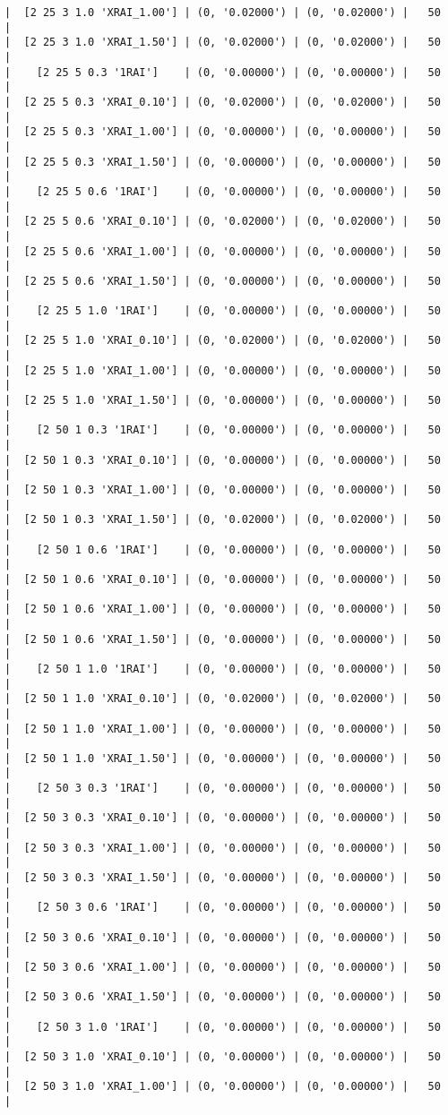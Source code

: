\documentclass{article}
\begin{document}
\begin{verbatim}
|  [2 25 3 1.0 'XRAI_1.00'] | (0, '0.02000') | (0, '0.02000') |   50  |
|  [2 25 3 1.0 'XRAI_1.50'] | (0, '0.02000') | (0, '0.02000') |   50  |
|    [2 25 5 0.3 '1RAI']    | (0, '0.00000') | (0, '0.00000') |   50  |
|  [2 25 5 0.3 'XRAI_0.10'] | (0, '0.02000') | (0, '0.02000') |   50  |
|  [2 25 5 0.3 'XRAI_1.00'] | (0, '0.00000') | (0, '0.00000') |   50  |
|  [2 25 5 0.3 'XRAI_1.50'] | (0, '0.00000') | (0, '0.00000') |   50  |
|    [2 25 5 0.6 '1RAI']    | (0, '0.00000') | (0, '0.00000') |   50  |
|  [2 25 5 0.6 'XRAI_0.10'] | (0, '0.02000') | (0, '0.02000') |   50  |
|  [2 25 5 0.6 'XRAI_1.00'] | (0, '0.00000') | (0, '0.00000') |   50  |
|  [2 25 5 0.6 'XRAI_1.50'] | (0, '0.00000') | (0, '0.00000') |   50  |
|    [2 25 5 1.0 '1RAI']    | (0, '0.00000') | (0, '0.00000') |   50  |
|  [2 25 5 1.0 'XRAI_0.10'] | (0, '0.02000') | (0, '0.02000') |   50  |
|  [2 25 5 1.0 'XRAI_1.00'] | (0, '0.00000') | (0, '0.00000') |   50  |
|  [2 25 5 1.0 'XRAI_1.50'] | (0, '0.00000') | (0, '0.00000') |   50  |
|    [2 50 1 0.3 '1RAI']    | (0, '0.00000') | (0, '0.00000') |   50  |
|  [2 50 1 0.3 'XRAI_0.10'] | (0, '0.00000') | (0, '0.00000') |   50  |
|  [2 50 1 0.3 'XRAI_1.00'] | (0, '0.00000') | (0, '0.00000') |   50  |
|  [2 50 1 0.3 'XRAI_1.50'] | (0, '0.02000') | (0, '0.02000') |   50  |
|    [2 50 1 0.6 '1RAI']    | (0, '0.00000') | (0, '0.00000') |   50  |
|  [2 50 1 0.6 'XRAI_0.10'] | (0, '0.00000') | (0, '0.00000') |   50  |
|  [2 50 1 0.6 'XRAI_1.00'] | (0, '0.00000') | (0, '0.00000') |   50  |
|  [2 50 1 0.6 'XRAI_1.50'] | (0, '0.00000') | (0, '0.00000') |   50  |
|    [2 50 1 1.0 '1RAI']    | (0, '0.00000') | (0, '0.00000') |   50  |
|  [2 50 1 1.0 'XRAI_0.10'] | (0, '0.02000') | (0, '0.02000') |   50  |
|  [2 50 1 1.0 'XRAI_1.00'] | (0, '0.00000') | (0, '0.00000') |   50  |
|  [2 50 1 1.0 'XRAI_1.50'] | (0, '0.00000') | (0, '0.00000') |   50  |
|    [2 50 3 0.3 '1RAI']    | (0, '0.00000') | (0, '0.00000') |   50  |
|  [2 50 3 0.3 'XRAI_0.10'] | (0, '0.00000') | (0, '0.00000') |   50  |
|  [2 50 3 0.3 'XRAI_1.00'] | (0, '0.00000') | (0, '0.00000') |   50  |
|  [2 50 3 0.3 'XRAI_1.50'] | (0, '0.00000') | (0, '0.00000') |   50  |
|    [2 50 3 0.6 '1RAI']    | (0, '0.00000') | (0, '0.00000') |   50  |
|  [2 50 3 0.6 'XRAI_0.10'] | (0, '0.00000') | (0, '0.00000') |   50  |
|  [2 50 3 0.6 'XRAI_1.00'] | (0, '0.00000') | (0, '0.00000') |   50  |
|  [2 50 3 0.6 'XRAI_1.50'] | (0, '0.00000') | (0, '0.00000') |   50  |
|    [2 50 3 1.0 '1RAI']    | (0, '0.00000') | (0, '0.00000') |   50  |
|  [2 50 3 1.0 'XRAI_0.10'] | (0, '0.00000') | (0, '0.00000') |   50  |
|  [2 50 3 1.0 'XRAI_1.00'] | (0, '0.00000') | (0, '0.00000') |   50  |

\end{verbatim}
\end{document}
